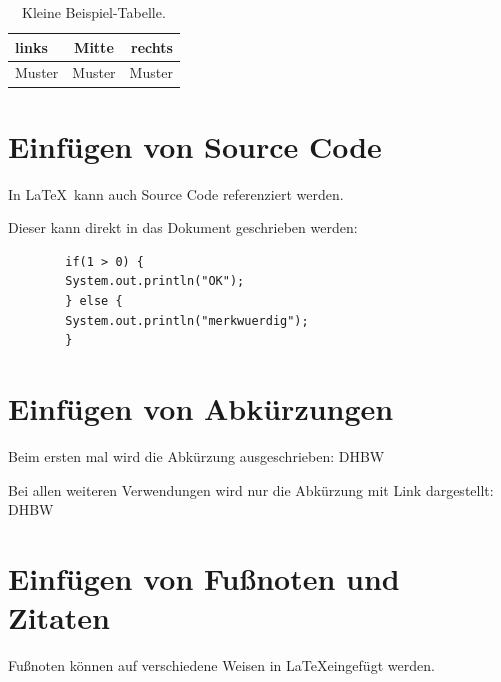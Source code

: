 \begin{table}[htb]
    \centering
    \begin{tabular}{lcr}
        links & Mitte & rechts \\
        \hline
        Muster & Muster & Muster \\
    \end{tabular}
    \caption{Kleine Beispiel-Tabelle.}
    \label{tab:BeispielTabelleKlein}
\end{table}

\section{Einfügen von Source Code}\label{section:source_code}

\lstset{language=Java}

    In \LaTeX\ kann auch Source Code referenziert werden.

    Dieser kann direkt in das Dokument geschrieben werden:

    \begin{lstlisting}
        if(1 > 0) {
        System.out.println("OK"); 
        } else {
        System.out.println("merkwuerdig");
        }
    \end{lstlisting}

\section{Einfügen von Abkürzungen}\label{section:abkuerzungen}

Beim ersten mal wird die Abkürzung ausgeschrieben: \ac{DHBW}

Bei allen weiteren Verwendungen wird nur die Abkürzung mit Link dargestellt: \ac{DHBW}

\section{Einfügen von Fußnoten und Zitaten}\label{section:zitate}

Fußnoten können auf verschiedene Weisen in \LaTeX eingefügt werden.

